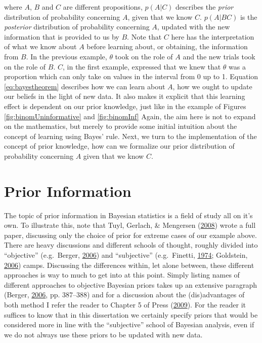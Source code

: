 \documentclass[openright,titlepage,12pt,a4paper]{book}
\begin{document}
where \(A\), \(B\) and \(C\) are different propositions, \(p(A|C)\) describes the \emph{prior} distribution of probability concerning \(A\), given that we know \(C\). \(p(A|BC)\) is the \emph{posterior} distribution of probability concerning \(A\), updated with the new information that is provided to us by \(B\). Note that \(C\) here has the interpretation of what we know about \(A\) before learning about, or obtaining, the information from \(B\). In the previous example, \(\theta\) took on the role of \(A\) and the new trials took on the role of \(B\). \(C\), in the first example, expressed that we knew that \(\theta\) was a proportion which can only take on values in the interval from 0 up to 1. Equation \eqref{eq:bayestheorem} describes how we can learn about \(A\), how we ought to update our beliefs in the light of new data. It also makes it explicit that this learning effect is dependent on our prior knowledge, just like in the example of Figures \ref{fig:binomUninformative} and \ref{fig:binomInf} Again, the aim here is not to expand on the mathematics, but merely to provide some initial intuition about the concept of learning using Bayes' rule. Next, we turn to the implementation of the concept of prior knowledge, how can we formalize our prior distribution of probability concerning \(A\) given that we know \(C\).

\hypertarget{prior-information}{%
\section{Prior Information}\label{prior-information}}

The topic of prior information in Bayesian statistics is a field of study all on it's own. To illustrate this, note that Tuyl, Gerlach, \& Mengersen (\protect\hyperlink{ref-tuyl_comparison_2008}{2008}) wrote a full paper, discussing only the choice of prior for extreme cases of our example above. There are heavy discussions and different schools of thought, roughly divided into ``objective'' (e.g.~Berger, \protect\hyperlink{ref-berger_case_2006}{2006}) and ``subjective'' (e.g.~Finetti, \protect\hyperlink{ref-de_finetti_theory_1974}{1974}; Goldstein, \protect\hyperlink{ref-goldstein_subjective_2006}{2006}) camps. Discussing the differences within, let alone between, these different approaches is way to much to get into at this point. Simply listing names of different approaches to objective Bayesian priors takes up an extensive paragraph (Berger, \protect\hyperlink{ref-berger_case_2006}{2006}, pp. 387--388) and for a discussion about the (dis)advantages of both method I refer the reader to Chapter 5 of Press (\protect\hyperlink{ref-press_subjective_2009}{2009}). For the reader it suffices to know that in this dissertation we certainly specify priors that would be considered more in line with the ``subjective'' school of Bayesian analysis, even if we do not always use these priors to be updated with new data.
\end{document}
